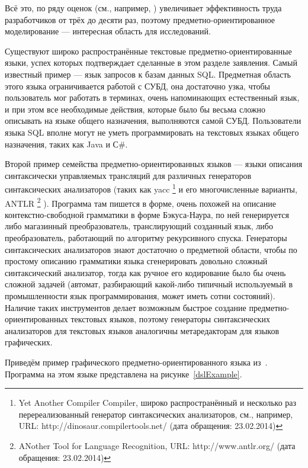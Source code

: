 Всё это, по ряду оценок (см., например, \cite{kieburtz1996software, kelly2000visual, gray2003examination})
увеличивает эффективность труда разработчиков от трёх до десяти раз, поэтому 
предметно-ориентированное моделирование --- интересная область для исследований.

Существуют широко распространённые текстовые предметно-ориентированные языки, 
успех которых подтверждает сделанные в этом разделе заявления. Самый известный 
пример --- язык запросов к базам данных SQL. Предметная область этого языка 
ограничивается работой с СУБД, она достаточно узка, чтобы пользователь мог 
работать в терминах, очень напоминающих естественный язык, и при этом все 
необходимые действия, которые было бы весьма сложно описывать на языке общего 
назначения, выполняются самой СУБД. Пользователи языка SQL вполне могут не уметь 
программировать на текстовых языках общего назначения, таких как Java и С\#. 

Второй пример семейства предметно-ориентированных языков --- языки описания 
синтаксически управляемых трансляций для различных генераторов синтаксических 
анализаторов (таких как yacc%
\footnote{Yet Another Compiler Compiler, широко распространённый и несколько раз перереализованный генератор 
синтаксических анализаторов, см., например, URL: http://dinosaur.compilertools.net/ (дата обращения: 23.02.2014)}
 и его многочисленные варианты, ANTLR%
\footnote{ANother Tool for Language Recognition, URL: http://www.antlr.org/ (дата обращения: 23.02.2014)}
). Программа там пишется в форме, очень похожей на описание контекстно-свободной 
грамматики в форме Бэкуса-Наура, по ней генерируется либо магазинный 
преобразователь, транслирующий созданный язык, либо преобразователь, работающий 
по алгоритму рекурсивного спуска. Генераторы синтаксических анализаторов знают 
достаточно о предметной области, чтобы по простому описанию грамматики языка 
сгенерировать довольно сложный синтаксический анализатор, тогда как ручное его 
кодирование было бы очень сложной задачей (автомат, разбирающий какой-либо 
типичный используемый в промышленности язык программирования, может иметь сотни 
состояний). Наличие таких инструментов делает возможным быстрое создание 
предметно-ориентированных текстовых языков, поэтому генераторы синтаксических 
анализаторов для текстовых языков аналогичны метаредакторам для языков 
графических.

Приведём пример графического предметно-ориентированного языка из~\cite{kelly2008domain}.
Программа на этом языке представлена на рисунке~\ref{dslExample}.

